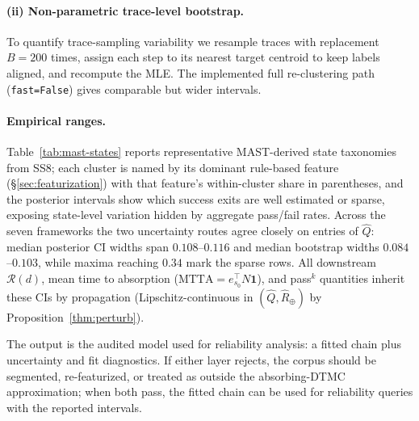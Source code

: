 \paragraph{(ii) Non-parametric trace-level bootstrap.}
To quantify trace-sampling variability we resample traces with
replacement $B=200$ times, assign each step to its nearest target
centroid to keep labels aligned, and recompute the MLE. The implemented full
re-clustering path (\texttt{fast=False}) gives comparable but wider
intervals.

\paragraph{Empirical ranges.}
Table~\ref{tab:mast-states} reports representative MAST-derived state
taxonomies from SS8; each cluster is named by its dominant rule-based
feature (\S\ref{sec:featurization}) with that feature's within-cluster
share in parentheses, and the posterior intervals show which
success exits are well estimated or sparse, exposing state-level
variation hidden by aggregate pass/fail rates. Across the seven frameworks the two
uncertainty routes agree closely on entries of $\hat Q$: median
posterior CI widths span $0.108$--$0.116$ and median bootstrap widths
$0.084$--$0.103$, while maxima reaching $0.34$ mark the sparse rows. All downstream $\mathcal{R}(d)$, mean time to
absorption ($\mathrm{MTTA}=e_{s_0}^{\top}N\mathbf{1}$), and pass$^k$
quantities inherit these CIs
by propagation (Lipschitz-continuous in $(\hat Q,\hat R_\oplus)$ by
Proposition~\ref{thm:perturb}).



The output is the audited model used for reliability analysis: a
fitted chain plus uncertainty and fit diagnostics. If either layer
rejects, the corpus should be segmented, re-featurized, or treated as
outside the absorbing-DTMC approximation; when both pass, the fitted
chain can be used for reliability queries with the reported intervals.

